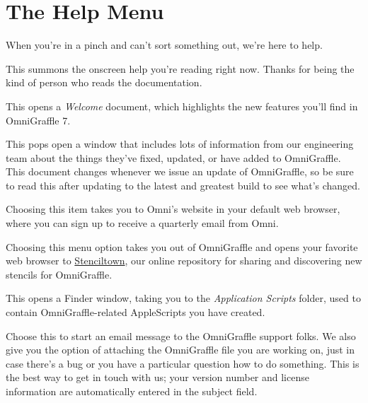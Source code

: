 \documentclass[../main.tex]{subfiles}
\begin{document}
  \section{The Help Menu}

  When you're in a pinch and can't sort something out, we're here to help.

  \begin{description}[style=nextline]
    \item[{OmniGraffle Help}] This summons the onscreen help you're reading right now. Thanks for
      being the kind of person who reads the documentation.
    \item[{Welcome to OmniGraffle 7}] This opens a \textit{Welcome} document, which highlights the
      new features you'll find in OmniGraffle 7.
    \item[{Release Notes}] This pops open a window that includes lots of information from our
      engineering team about the things they've fixed, updated, or have added to OmniGraffle. This
      document changes whenever we issue an update of OmniGraffle, so be sure to read this after
      updating to the latest and greatest build to see what's changed.
    \item[{Sign Up for the Omni Newsletter}] Choosing this item takes you to Omni's website in
      your default web browser, where you can sign up to receive a quarterly email from Omni.
    \item[{Get More Stencils}] Choosing this menu option takes you out of OmniGraffle and opens
      your favorite web browser to \href{https://stenciltown.omnigroup.com}{Stenciltown}, our
      online repository for sharing and discovering new stencils for OmniGraffle.
    \item[{Open Scripts Folder}] This opens a Finder window, taking you to the \textit{Application
      Scripts} folder, used to contain OmniGraffle-related AppleScripts you have created.
    \item[{Contact Omni}] Choose this to start an email message to the OmniGraffle support folks.
      We also give you the option of attaching the OmniGraffle file you are working on, just in
      case there's a bug or you have a particular question how to do something. This is the best
      way to get in touch with us; your version number and license information are automatically
      entered in the subject field.
  \end{description}
  
\end{document}
